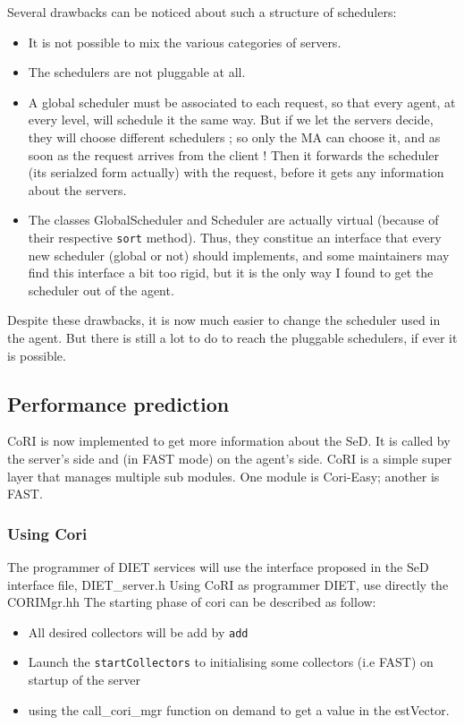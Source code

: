   Several drawbacks can be noticed about such a structure of schedulers:
  \begin{itemize}
  \item It is not possible to mix the various categories of servers.
  \item The schedulers are not pluggable at all.
  \item A global scheduler must be associated to each request, so that every
  agent, at every level, will schedule it the same way. But if we let the
  servers decide, they will choose different schedulers ; so only the MA can
  choose it, and as soon as the request arrives from the client ! Then it
  forwards the scheduler (its serialzed form actually) with the request, before
  it gets any information about the servers.
  \item The classes \textsf{GlobalScheduler} and \textsf{Scheduler} are actually
  virtual (because of their respective \texttt{sort} method). Thus, they
  constitue an interface that every new scheduler (global or not) should
  implements, and some maintainers may find this interface a bit too rigid, but
  it is the only way I found to get the scheduler out of the agent.
  \end{itemize}

  Despite these drawbacks, it is now much easier to change the scheduler used in
  the agent. But there is still a lot to do to reach the pluggable schedulers, if
  ever it is possible.

  \subsection{Performance prediction}\label{subsection:performance}
  CoRI is now implemented to get more information about the SeD.
  It is called by the server's side and (in FAST mode) on the agent's side. 
  CoRI is a simple super layer that manages multiple sub modules. One module
  is Cori-Easy; another is FAST.

  \subsubsection{Using Cori}
  The programmer of DIET services will use the
  interface proposed in the SeD interface file, \textsf{DIET\_server.h}
  Using CoRI as programmer DIET, use directly the
  \textsf{CORIMgr.hh}
  The starting phase of cori can be described as follow:
   \begin{itemize}
  \item All desired collectors will be add by \texttt{add} 
  \item Launch the \texttt{startCollectors} to initialising some collectors
    (i.e FAST) on startup of the server
  \item using the \textsf{call\_cori\_mgr} function on 
    demand to get a value in the estVector.
  \end{itemize}
  
